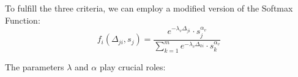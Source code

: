 \documentclass[conference]{IEEEtran}
\begin{document}


To fulfill the three criteria, we can employ a modified version of the Softmax Function:
    $$f_i(\Delta_{ji}, s_j) = \frac{e^{-\lambda_v \Delta_{ji}} \cdot s_j^{\alpha_v}}{\sum_{k=1}^{m} e^{-\lambda_v \Delta_{ki}} \cdot s_k^{\alpha_v}}$$











The parameters $\lambda$ and $\alpha$ play  crucial roles:
\end{document}

